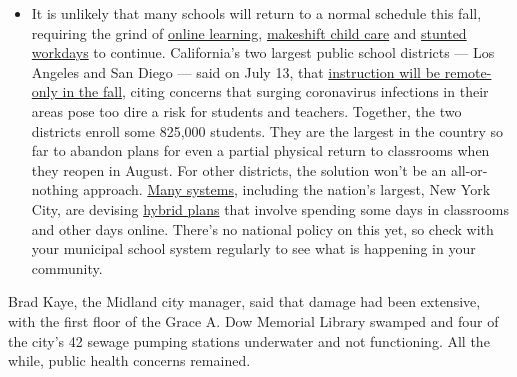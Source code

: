 \begin{itemize}
  \begin{itemize}
  \tightlist
  \item
    It is unlikely that many schools will return to a normal schedule
    this fall, requiring the grind of
    \href{https://www.nytimes.com/2020/06/05/us/coronavirus-education-lost-learning.html?action=click\&pgtype=Article\&state=default\&region=MAIN_CONTENT_3\&context=storylines_faq}{online
    learning},
    \href{https://www.nytimes.com/2020/05/29/us/coronavirus-child-care-centers.html?action=click\&pgtype=Article\&state=default\&region=MAIN_CONTENT_3\&context=storylines_faq}{makeshift
    child care} and
    \href{https://www.nytimes.com/2020/06/03/business/economy/coronavirus-working-women.html?action=click\&pgtype=Article\&state=default\&region=MAIN_CONTENT_3\&context=storylines_faq}{stunted
    workdays} to continue. California's two largest public school
    districts --- Los Angeles and San Diego --- said on July 13, that
    \href{https://www.nytimes.com/2020/07/13/us/lausd-san-diego-school-reopening.html?action=click\&pgtype=Article\&state=default\&region=MAIN_CONTENT_3\&context=storylines_faq}{instruction
    will be remote-only in the fall}, citing concerns that surging
    coronavirus infections in their areas pose too dire a risk for
    students and teachers. Together, the two districts enroll some
    825,000 students. They are the largest in the country so far to
    abandon plans for even a partial physical return to classrooms when
    they reopen in August. For other districts, the solution won't be an
    all-or-nothing approach.
    \href{https://bioethics.jhu.edu/research-and-outreach/projects/eschool-initiative/school-policy-tracker/}{Many
    systems}, including the nation's largest, New York City, are
    devising
    \href{https://www.nytimes.com/2020/06/26/us/coronavirus-schools-reopen-fall.html?action=click\&pgtype=Article\&state=default\&region=MAIN_CONTENT_3\&context=storylines_faq}{hybrid
    plans} that involve spending some days in classrooms and other days
    online. There's no national policy on this yet, so check with your
    municipal school system regularly to see what is happening in your
    community.
  \end{itemize}
\end{itemize}

Brad Kaye, the Midland city manager, said that damage had been
extensive, with the first floor of the Grace A. Dow Memorial Library
swamped and four of the city's 42 sewage pumping stations underwater and
not functioning. All the while, public health concerns remained.

